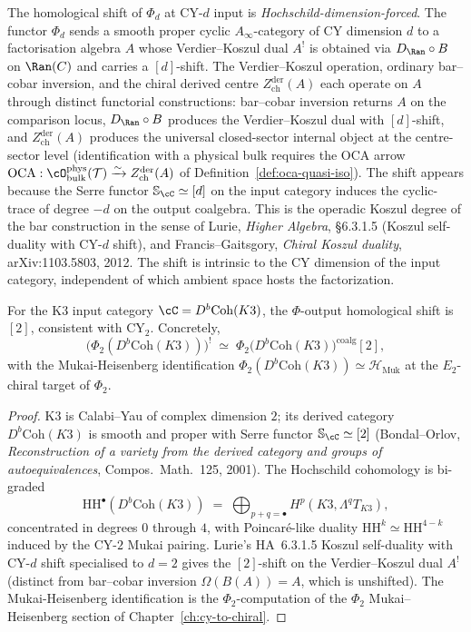 The homological shift of $\Phi_d$ at CY-$d$ input is
\emph{Hochschild-dimension-forced}. The functor $\Phi_d$ sends a
smooth proper cyclic $A_\infty$-category of CY dimension $d$ to a
factorisation algebra $A$ whose Verdier--Koszul dual $A^!$ is
obtained via $D_{\Ran} \circ B$ on $\Ran(C)$ and carries a $[d]$-shift.
The Verdier--Koszul operation, ordinary bar--cobar inversion, and the
chiral derived centre $Z^{\mathrm{der}}_{\mathrm{ch}}(A)$ each operate
on $A$ through distinct functorial constructions: bar--cobar
inversion returns $A$ on the comparison locus, $D_{\Ran} \circ B$
produces the Verdier--Koszul dual with $[d]$-shift, and
$Z^{\mathrm{der}}_{\mathrm{ch}}(A)$ produces the universal closed-sector
internal object at the centre-sector level (identification with a
physical bulk requires the OCA arrow
$\mathrm{OCA}: \cO^{\mathrm{phys}}_{\mathrm{bulk}}(\mathcal T) \xrightarrow{\sim} Z^{\mathrm{der}}_{\mathrm{ch}}(A)$
of Definition~\ref{def:oca-quasi-iso}). The shift appears because the
Serre functor $\mathbb{S}_\cC\simeq[d]$ on the input category induces
the cyclic-trace of degree $-d$ on the output coalgebra. This is the
operadic Koszul degree of the bar construction in the sense of Lurie,
\emph{Higher Algebra}, \S6.3.1.5 (Koszul self-duality with CY-$d$
shift), and Francis--Gaitsgory, \emph{Chiral Koszul duality},
arXiv:1103.5803, 2012. The shift is intrinsic to the CY dimension of
the input category, independent of which ambient space hosts the
factorization.

\begin{theorem}
\label{thm:phi-output-shift-k3-2}
For the K3 input category $\cC = D^b\mathrm{Coh}(K3)$, the $\Phi$-output homological shift is $[2]$, consistent with $\mathrm{CY}_2$. Concretely,
\[
 \bigl(\Phi_2(D^b\mathrm{Coh}(K3))\bigr)^{!}
 \;\simeq\;
 \Phi_2\bigl(D^b\mathrm{Coh}(K3)\bigr)^{\mathrm{coalg}}[2],
\]
with the Mukai-Heisenberg identification $\Phi_2(D^b\mathrm{Coh}(K3)) \simeq \mathcal{H}_{\mathrm{Muk}}$ at the $E_2$-chiral target of $\Phi_2$.
\end{theorem}

\begin{proof}
K3 is Calabi--Yau of complex dimension $2$; its derived category $D^b\mathrm{Coh}(K3)$ is smooth and proper with Serre functor $\mathbb{S}_{\cC}\simeq[2]$ (Bondal--Orlov, \emph{Reconstruction of a variety from the derived category and groups of autoequivalences}, Compos.~Math.~125, 2001). The Hochschild cohomology is bi-graded
\[
 \mathrm{HH}^\bullet(D^b\mathrm{Coh}(K3))
 \;=\;
 \bigoplus_{p+q=\bullet}H^p(K3,\Lambda^q T_{K3}),
\]
concentrated in degrees $0$ through $4$, with Poincar\'e-like duality $\mathrm{HH}^k\simeq\mathrm{HH}^{4-k}$ induced by the CY-$2$ Mukai pairing. Lurie's HA~6.3.1.5 Koszul self-duality with CY-$d$ shift specialised to $d=2$ gives the $[2]$-shift on the Verdier--Koszul dual $A^!$ (distinct from bar--cobar inversion $\Omega(B(A))=A$, which is unshifted). The Mukai-Heisenberg identification is the $\Phi_2$-computation of the $\Phi_2$ Mukai--Heisenberg section of Chapter~\ref{ch:cy-to-chiral}.
\end{proof}

